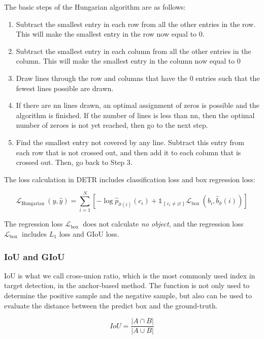 The basic steps of the Hungarian algorithm are as follows:
\begin{enumerate}[1.]
	\item Subtract the smallest entry in each row from all the other entries in the row. This will make the smallest entry in the row now equal to 0.
	\item Subtract the smallest entry in each column from all the other entries in the column. This will make the smallest entry in the column now equal to 0
	\item Draw lines through the row and columns that have the 0 entries such that the fewest lines possible are drawn.
	\item  If there are nn lines drawn, an optimal assignment of zeros is possible and the algorithm is finished. If the number of lines is less than nn, then the optimal number of zeroes is not yet reached, then go to the next step.
	\item Find the smallest entry not covered by any line. Subtract this entry from each row that is not  crossed out, and then add it to each column that is crossed out. Then, go back to Step 3.
\end{enumerate}

The loss calculation in DETR includes classification loss and box regression loss:

\begin{equation}
	\mathcal{L}_{\text {Hungarian }}(y, \hat{y})=\sum_{i=1}^{N}\left[-\log \hat{p}_{\hat{\sigma}(i)}\left(c_{i}\right)+\mathbb{1}_{\left\{c_{i} \neq \varnothing\right\}} \mathcal{L}_{\text {box }}\left(b_{i}, \hat{b}_{\hat{\sigma}}(i)\right)\right]
\end{equation}

The regression loss $ \mathcal{L}_{\text {box }} $ does not calculate \textit{no object}, and the regression loss $ \mathcal{L}_{\text {box }} $ includes $  L_1 $ loss and GIoU loss.

\subsubsection{IoU and GIoU}

IoU is what we call cross-union ratio, which is the most commonly used index in target detection, in the anchor-based method. The function is not only used to determine the positive sample and the negative sample, but also can be used to evaluate the distance between the predict box and the ground-truth.

$$
I o U=\frac{|A \cap B|}{|A \cup B|}
$$

